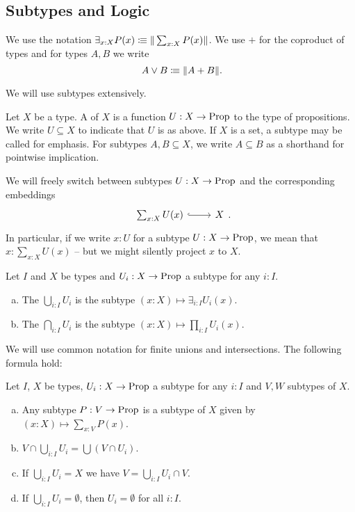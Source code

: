 \subsection{Subtypes and Logic}

We use the notation $\exists_{x:X}P(x)\vcentcolon\mspace{-1.2mu}\equiv \|\sum_{x:X}P(x)\|$.
We use $+$ for the coproduct of types and for types $A,B$ we write
\[ A\vee B\colonequiv \| A+B \|\rlap{.}\]

We will use subtypes extensively.

\begin{definition}
  \index{$\subseteq$}
  Let $X$ be a type.
  A  of $X$ is a function $U:X\to\mathrm{Prop}$ to the type of propositions.
  We write $U\subseteq X$ to indicate that $U$ is as above.
  If $X$ is a set, a subtype may be called  for emphasis.
  For subtypes $A,B\subseteq X$, we write $A\subseteq B$ as a shorthand for pointwise implication.
\end{definition}

We will freely switch between subtypes $U:X\to\mathrm{Prop}$ and the corresponding embeddings
\[
  \begin{tikzcd}
    \sum_{x:X}U(x) \ar[r,hook] & X
  \end{tikzcd}
  \rlap{.}
\]
In particular, if we write $x:U$ for a subtype $U:X\to\mathrm{Prop}$, we mean that $x:\sum_{x:X}U(x)$ -- but we might silently project $x$ to $X$.

\begin{definition}
  Let $I$ and $X$ be types and $U_i:X\to\mathrm{Prop}$ a subtype for any $i:I$.
  \begin{enumerate}[(a)]
  \item The  $\bigcup_{i:I}U_i$ is the subtype $(x:X)\mapsto \exists_{i:I}U_i(x)$.
  \item The  $\bigcap_{i:I}U_i$ is the subtype $(x:X)\mapsto\prod_{i:I}U_i(x)$.
  \end{enumerate}
\end{definition}

We will use common notation for finite unions and intersections.
The following formula hold:

\begin{lemma}
  Let $I$, $X$ be types, $U_i:X\to\mathrm{Prop}$ a subtype for any $i:I$ and $V,W$ subtypes of $X$.
  \begin{enumerate}[(a)]
  \item Any subtype $P:V\to\mathrm{Prop}$ is a subtype of $X$ given by $(x:X)\mapsto\sum_{x:V}P(x)$.
  \item $V\cap \bigcup_{i:I} U_i=\bigcup (V\cap U_i)$.
  \item If $\bigcup_{i:I}U_i=X$ we have $V=\bigcup_{i:I}U_i\cap V$.
  \item If $\bigcup_{i:I}U_i=\emptyset$, then $U_i=\emptyset$ for all $i:I$.
  \end{enumerate}
\end{lemma}

